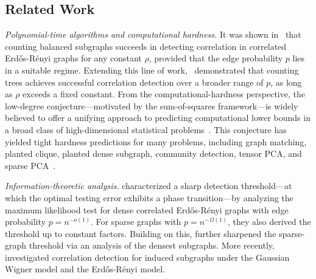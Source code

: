 \documentclass[letterpaper,11pt]{article}
\theoremstyle{definition}
\newcommand{\maP}{\mathcal{P}}
\newcommand{\ER}{Erd\H{o}s-R\'enyi }
\begin{document}
\subsection{Related Work}


\emph{Polynomial-time algorithms and computational hardness.}
It was shown in~\cite{barak2019nearly} that counting balanced subgraphs succeeds in detecting correlation in correlated \ER graphs for any constant $\rho$, provided that the edge probability $p$ lies in a suitable regime. Extending this line of work,~\cite{mao2024testing} demonstrated that counting trees achieves successful correlation detection over a broader range of $p$, as long as $\rho$ exceeds a fixed constant.
From the computational-hardness perspective, the low-degree conjecture—motivated by the sum-of-squares framework—is widely believed to offer a unifying approach to predicting computational lower bounds in a broad class of high-dimensional statistical problems~\citep{hopkins2017efficient,hopkins2018statistical,schramm2022computational,sohn2025sharp}. This conjecture has yielded tight hardness predictions for many problems, including graph matching, planted clique, planted dense subgraph, community detection, tensor PCA, and sparse PCA~\citep{hopkins2017efficient,hopkins2017power,hopkins2018statistical,bandeira2019computational,schramm2022computational,ding2023low,kunisky2024tensor,dhawan2025detection,li2025algorithmic}. %

\emph{Information-theoretic analysis.}
\cite{wu2023testing} characterized a sharp detection threshold—at which the optimal testing error exhibits a phase transition—by analyzing the maximum likelihood test for dense correlated \ER graphs with edge probability $p=n^{-o(1)}$. For sparse graphs with $p=n^{-\Omega(1)}$, they also derived the threshold up to constant factors. Building on this, \cite{ding2023detection} further sharpened the sparse-graph threshold via an analysis of the densest subgraphs. More recently, \cite{huang2025sample,huang2026information} investigated correlation detection for induced subgraphs under the Gaussian Wigner model and the \ER model.
\end{document}
